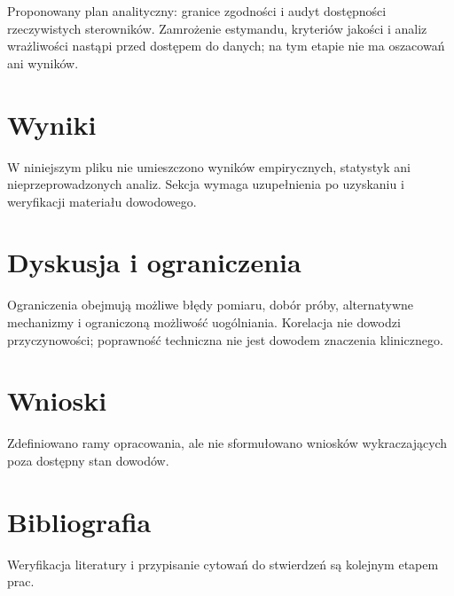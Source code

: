 \documentclass[11pt,a4paper]{article}
\begin{document}
Proponowany plan analityczny: granice zgodności i audyt dostępności rzeczywistych sterowników. Zamrożenie estymandu, kryteriów jakości i analiz wrażliwości nastąpi przed dostępem do danych; na tym etapie nie ma oszacowań ani wyników.

\section{Wyniki}

W niniejszym pliku nie umieszczono wyników empirycznych, statystyk ani nieprzeprowadzonych analiz. Sekcja wymaga uzupełnienia po uzyskaniu i weryfikacji materiału dowodowego.

\section{Dyskusja i ograniczenia}

Ograniczenia obejmują możliwe błędy pomiaru, dobór próby, alternatywne mechanizmy i ograniczoną możliwość uogólniania. Korelacja nie dowodzi przyczynowości; poprawność techniczna nie jest dowodem znaczenia klinicznego.

\section{Wnioski}

Zdefiniowano ramy opracowania, ale nie sformułowano wniosków wykraczających poza dostępny stan dowodów.

\section*{Bibliografia}

Weryfikacja literatury i przypisanie cytowań do stwierdzeń są kolejnym etapem prac.
\end{document}
